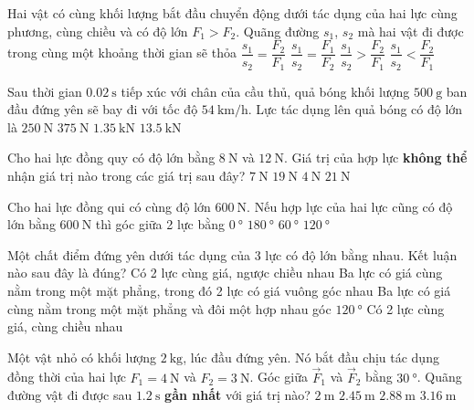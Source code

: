 \begin{ex}
	Hai vật có cùng khối lượng bắt đầu chuyển động dưới tác dụng của hai lực cùng phương, cùng chiều và có độ lớn $F_1>F_2$. Quãng đường $s_1$, $s_2$ mà hai vật đi được trong cùng một khoảng thời gian sẽ thỏa
	\choice
	{$\dfrac{s_1}{s_2}=\dfrac{F_2}{F_1}$}
	{\True $\dfrac{s_1}{s_2}=\dfrac{F_1}{F_2}$}
	{$\dfrac{s_1}{s_2}>\dfrac{F_2}{F_1}$}
	{$\dfrac{s_1}{s_2}<\dfrac{F_2}{F_1}$}
	\loigiai{}
\end{ex}
\begin{ex}
Sau thời gian $\SI{0.02}{\second}$ tiếp xúc với chân của cầu thủ, quả bóng khối lượng $\SI{500}{\gram}$ ban đầu đứng yên sẽ bay đi với tốc độ $\SI{54}{\kilo\meter/\hour}$. Lực tác dụng lên quả bóng có độ lớn là	
	\choice
	{$\SI{250}{\newton}$}
	{\True $\SI{375}{\newton}$}
	{$\SI{1.35}{\kilo\newton}$}
	{$\SI{13.5}{\kilo\newton}$}
	\loigiai{}
\end{ex}
\begin{ex}
	Cho hai lực đồng quy có độ lớn bằng $\SI{8}{\newton}$ và $\SI{12}{\newton}$. Giá trị của hợp lực \textbf{không thể} nhận giá trị nào trong các giá trị sau đây?
	\choice
	{$\SI{7}{\newton}$}
	{$\SI{19}{\newton}$}
	{$\SI{4}{\newton}$}
	{\True $\SI{21}{\newton}$}
	\loigiai{}
\end{ex}
\begin{ex}
	Cho hai lực đồng qui có cùng độ lớn $\SI{600}{\newton}$. Nếu hợp lực của hai lực cũng có độ lớn bằng $\SI{600}{\newton}$ thì góc giữa 2 lực bằng
	\choice
	{$\SI{0}{\degree}$}
	{$\SI{180}{\degree}$}
	{$\SI{60}{\degree}$}
	{\True $\SI{120}{\degree}$}
	\loigiai{}
\end{ex}
\begin{ex}
	Một chất điểm đứng yên dưới tác dụng của 3 lực có độ lớn bằng nhau. Kết luận nào sau đây là đúng?
	\choice
	{Có 2 lực cùng giá, ngược chiều nhau}
	{Ba lực có giá cùng nằm trong một mặt phẳng, trong đó 2 lực có giá vuông góc nhau}
	{\True Ba lực có giá cùng nằm trong một mặt phẳng và đôi một hợp nhau góc $\SI{120}{\degree}$}
	{Có 2 lực cùng giá, cùng chiều nhau}
	\loigiai{}
\end{ex}
\begin{ex}
	Một vật nhỏ có khối lượng $\SI{2}{\kilogram}$, lúc đầu đứng yên. Nó bắt đầu chịu tác dụng đồng thời của hai lực $F_1=\SI{4}{\newton}$ và $F_2=\SI{3}{\newton}$. Góc giữa $\vec{F}_1$ và $\vec{F}_2$ bằng $\SI{30}{\degree}$. Quãng đường vật đi được sau $\SI{1.2}{\second}$ \textbf{gần nhất} với giá trị nào?
	\choice
	{$\SI{2}{\meter}$}
	{\True $\SI{2.45}{\meter}$}
	{$\SI{2.88}{\meter}$}
	{$\SI{3.16}{\meter}$}
	\loigiai{}
\end{ex}
